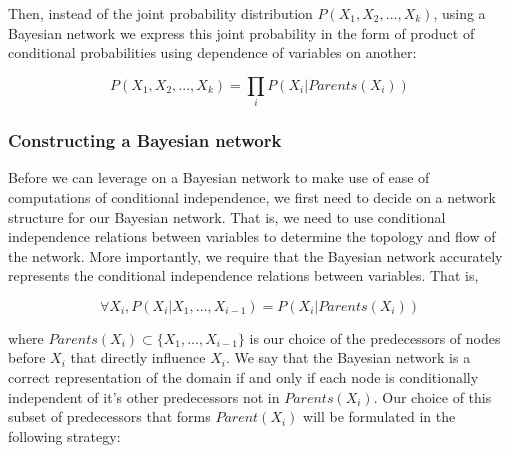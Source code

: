 \documentclass[12pt]{article}
\begin{document}
Then, instead of the joint probability distribution $P(X_1, X_2,..., X_k)$, using a Bayesian network we express this joint probability in the form of product of conditional probabilities using dependence of variables on another:

\begin{equation*}
P(X_1, X_2,..., X_k) = \prod_i P(X_i | Parents(X_i))
\end{equation*}

\subsubsection{Constructing a Bayesian network}

Before we can leverage on a Bayesian network to make use of ease of computations of conditional independence, we first need to decide on a network structure for our Bayesian network. That is, we need to use conditional independence relations between variables to determine the topology and flow of the network. More importantly, we require that the Bayesian network accurately represents the conditional independence relations between variables. That is,

\begin{equation*}
\forall X_i, P(X_i | X_1, ..., X_{i-1}) = P(X_i | Parents(X_i))
\end{equation*}
 
where $Parents(X_i) \subset \{X_1, ..., X_{i-1} \}$ is our choice of the predecessors of nodes before $X_i$ that directly influence $X_i$. We say that the Bayesian network is a correct representation of the domain if and only if each node is conditionally independent of it's other predecessors not in $Parents(X_i)$. Our choice of this subset of predecessors that forms $Parent(X_i)$ will be formulated in the following strategy:
\end{document}
